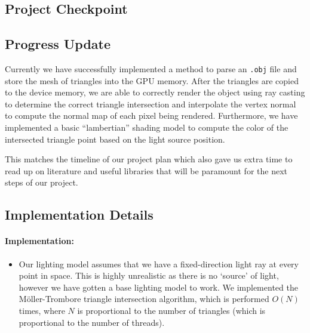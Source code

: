 \documentclass[12pt]{article}
\begin{document}
\begin{center}
    \section*{Project Checkpoint}
\end{center}


\subsection*{Progress Update}

Currently we have successfully implemented a method to parse an \texttt{.obj} file and store the
mesh of triangles into the GPU memory. After the triangles are copied to the device memory, we are
able to correctly render the object using ray casting to determine the correct triangle 
intersection and interpolate the vertex normal to compute the normal map of each pixel being
rendered. Furthermore, we have implemented a basic ``lambertian'' shading model to
compute the color of the intersected triangle point based on the light source position.

This matches the timeline of our project plan which also gave us extra time to read up on
literature and useful libraries that will be paramount for the next steps of our project.

\subsection*{Implementation Details}

\paragraph{Implementation:}

\begin{itemize}
    \item Our lighting model assumes that we have a fixed-direction light ray at every point in space. This is highly
        unrealistic as there is no `source' of light, however we have gotten a base lighting model to work. We implemented
        the M\"oller-Trombore triangle intersection algorithm, which is performed \(O(N)\) times, where \(N\) is proportional
        to the number of triangles (which is proportional to the number of threads).
\end{itemize}
\end{document}

